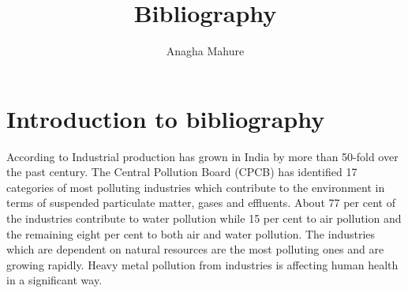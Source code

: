 \documentclass[12pt,a4paper]{report}
\author{Anagha Mahure}
\title{Bibliography}
\begin{document}
\maketitle



\section{Introduction to bibliography}
According to \cite{govil1999environmental} Industrial production has grown in India by more than 50-fold over the past century. The Central Pollution Board (CPCB) has identified 17 categories of most polluting industries which contribute to the environment in terms of suspended particulate matter, gases and effluents. About 77 per cent of the industries contribute to water pollution while 15 per cent to air pollution and the remaining eight per cent to both air and water pollution. The industries which are dependent on natural resources are the most polluting ones and are growing rapidly. Heavy metal pollution from industries is affecting human health in a significant way.

\end{document}
